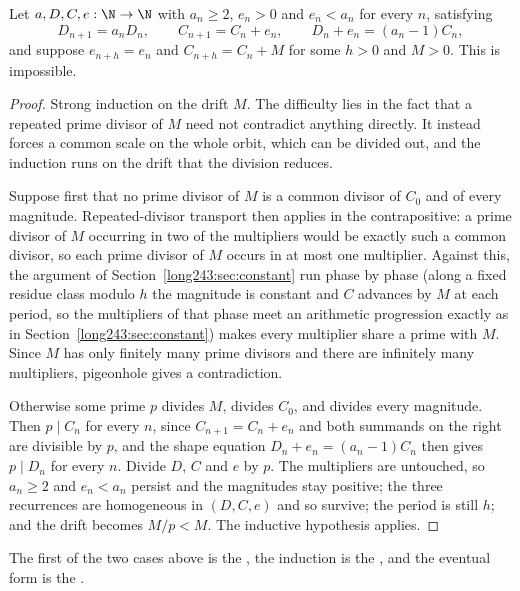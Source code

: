 \documentclass[11pt]{article}
\begin{document}
\begin{theorem}\label{long243:res:periodic}
Let $a,D,C,e:\N\to\N$ with $a_n\ge2$, $e_n>0$ and $e_n<a_n$ for every $n$,
satisfying
\[
 D_{n+1}=a_nD_n,\qquad C_{n+1}=C_n+e_n,\qquad D_n+e_n=(a_n-1)C_n ,
\]
and suppose $e_{n+h}=e_n$ and $C_{n+h}=C_n+M$ for some $h>0$ and $M>0$.  This
is impossible.
\end{theorem}

\begin{proof}
Strong induction on the drift $M$.  The difficulty lies in the fact that a
repeated prime divisor of $M$ need not contradict anything directly.  It
instead forces a common scale on the whole orbit, which can be divided out, and
the induction runs on the drift that the division reduces.

Suppose first that no prime divisor of $M$ is a common divisor of $C_0$ and of
every magnitude.  Repeated-divisor transport then applies in the
contrapositive: a prime divisor of $M$ occurring in two of the multipliers
would be exactly such a common divisor, so each prime divisor of $M$ occurs in
at most one multiplier.  Against this, the argument of
Section~\ref{long243:sec:constant} run phase by phase (along a fixed residue class
modulo $h$ the magnitude is constant and $C$ advances by $M$ at each period, so
the multipliers of that phase meet an arithmetic progression exactly as in
Section~\ref{long243:sec:constant}) makes every multiplier share a prime with $M$.
Since $M$ has only finitely many prime divisors and there are infinitely many
multipliers, pigeonhole gives a contradiction.

Otherwise some prime $p$ divides $M$, divides $C_0$, and divides every
magnitude.  Then $p\mid C_n$ for every $n$, since $C_{n+1}=C_n+e_n$ and both
summands on the right are divisible by $p$, and the shape equation
$D_n+e_n=(a_n-1)C_n$ then gives $p\mid D_n$ for every $n$.  Divide $D$, $C$ and
$e$ by $p$.  The multipliers are untouched, so $a_n\ge2$ and $e_n<a_n$ persist
and the magnitudes stay positive; the three recurrences are homogeneous in
$(D,C,e)$ and so survive; the period is still $h$; and the drift becomes
$M/p<M$.  The inductive hypothesis applies.
\end{proof}

\noindent The first of the two cases above is the
, the induction is the
, and the eventual form is the
.
\end{document}
